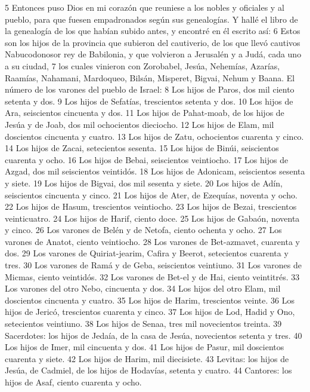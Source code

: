 5 Entonces puso Dios en mi corazón que reuniese a los nobles y oficiales y al pueblo, para que fuesen empadronados según sus genealogías. Y hallé el libro de la genealogía de los que habían subido antes, y encontré en él escrito así:
6 Estos son los hijos de la provincia que subieron del cautiverio, de los que llevó cautivos Nabucodonosor rey de Babilonia, y que volvieron a Jerusalén y a Judá, cada uno a su ciudad,
7 los cuales vinieron con Zorobabel, Jesúa, Nehemías, Azarías, Raamías, Nahamani, Mardoqueo, Bilsán, Misperet, Bigvai, Nehum y Baana. El número de los varones del pueblo de Israel:
8 Los hijos de Paros, dos mil ciento setenta y dos.
9 Los hijos de Sefatías, trescientos setenta y dos.
10 Los hijos de Ara, seiscientos cincuenta y dos.
11 Los hijos de Pahat-moab, de los hijos de Jesúa y de Joab, dos mil ochocientos dieciocho.
12 Los hijos de Elam, mil doscientos cincuenta y cuatro.
13 Los hijos de Zatu, ochocientos cuarenta y cinco.
14 Los hijos de Zacai, setecientos sesenta.
15 Los hijos de Binúi, seiscientos cuarenta y ocho.
16 Los hijos de Bebai, seiscientos veintiocho.
17 Los hijos de Azgad, dos mil seiscientos veintidós.
18 Los hijos de Adonicam, seiscientos sesenta y siete.
19 Los hijos de Bigvai, dos mil sesenta y siete.
20 Los hijos de Adín, seiscientos cincuenta y cinco.
21 Los hijos de Ater, de Ezequías, noventa y ocho.
22 Los hijos de Hasum, trescientos veintiocho.
23 Los hijos de Bezai, trescientos veinticuatro.
24 Los hijos de Harif, ciento doce.
25 Los hijos de Gabaón, noventa y cinco.
26 Los varones de Belén y de Netofa, ciento ochenta y ocho.
27 Los varones de Anatot, ciento veintiocho.
28 Los varones de Bet-azmavet, cuarenta y dos.
29 Los varones de Quiriat-jearim, Cafira y Beerot, setecientos cuarenta y tres.
30 Los varones de Ramá y de Geba, seiscientos veintiuno.
31 Los varones de Micmas, ciento veintidós.
32 Los varones de Bet-el y de Hai, ciento veintitrés.
33 Los varones del otro Nebo, cincuenta y dos.
34 Los hijos del otro Elam, mil doscientos cincuenta y cuatro.
35 Los hijos de Harim, trescientos veinte.
36 Los hijos de Jericó, trescientos cuarenta y cinco.
37 Los hijos de Lod, Hadid y Ono, setecientos veintiuno.
38 Los hijos de Senaa, tres mil novecientos treinta.
39 Sacerdotes: los hijos de Jedaía, de la casa de Jesúa, novecientos setenta y tres.
40 Los hijos de Imer, mil cincuenta y dos. 
41 Los hijos de Pasur, mil doscientos cuarenta y siete.
42 Los hijos de Harim, mil diecisiete.
43 Levitas: los hijos de Jesúa, de Cadmiel, de los hijos de Hodavías, setenta y cuatro.
44 Cantores: los hijos de Asaf, ciento cuarenta y ocho.
